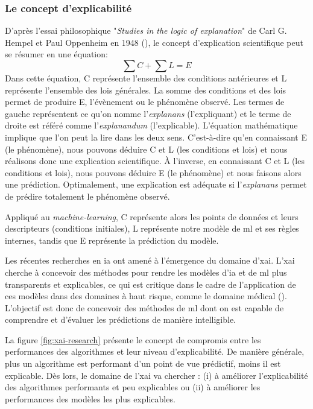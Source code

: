 \subsubsection{Le concept d'explicabilité}
D'après l'essai philosophique "\textit{Studies in the logic of explanation}" de Carl G. Hempel et Paul Oppenheim en 1948 (\cite{hempel_studies_1948}), le concept d'explication scientifique peut se résumer en une équation:
\[\sum C + \sum L = E\]
Dans cette équation, C représente l'ensemble des conditions antérieures et L représente l'ensemble des lois générales. La somme des conditions et des lois permet de produire E, l'évènement ou le phénomène observé. Les termes de gauche représentent ce qu’on nomme l’\textit{explanans} (l’expliquant) et le terme de droite est référé comme l’\textit{explanandum} (l’explicable). L’équation mathématique implique que l’on peut la lire dans les deux sens. C’est-à-dire qu’en connaissant E (le phénomène), nous pouvons déduire C et L (les conditions et lois) et nous réalisons donc une explication scientifique. À l’inverse, en connaissant C et L (les conditions et lois), nous pouvons déduire E (le phénomène) et nous faisons alors une prédiction. Optimalement, une explication est adéquate si l’\textit{explanans} permet de prédire totalement le phénomène observé.

Appliqué au \textit{machine-learning}, C représente alors les points de données et leurs descripteurs (conditions initiales), L représente notre modèle de \gls{ml} et ses règles internes, tandis que E représente la prédiction du modèle.

Les récentes recherches en \gls{ia} ont amené à l'émergence du domaine d'\gls{xai}. L'\gls{xai} cherche à concevoir des méthodes pour rendre les modèles d'\gls{ia} et de \gls{ml} plus transparents et explicables, ce qui est critique dans le cadre de l'application de ces modèles dans des domaines à haut risque, comme le domaine médical (\cite{arrieta_explainable_2019}). L'objectif est donc de concevoir des méthodes de \gls{ml} dont on est capable de comprendre et d'évaluer les prédictions de manière intelligible.

La figure \ref{fig:xai-research} présente le concept de compromis entre les performances des algorithmes et leur niveau d'explicabilité. De manière générale, plus un algorithme est performant d'un point de vue prédictif, moins il est explicable. Dès lors, le domaine de l'\gls{xai} va chercher : (i) à améliorer l'explicabilité des algorithmes performants et peu explicables ou (ii) à améliorer les performances des modèles les plus explicables.

